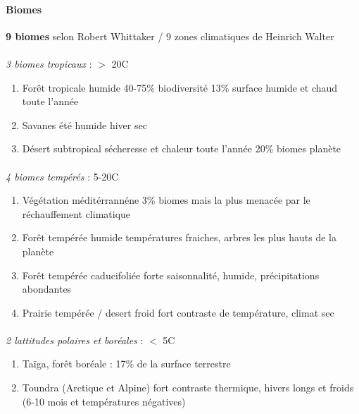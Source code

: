 \documentclass {article}
\begin{document}
\paragraph{Biomes}
\textbf{9 biomes} selon Robert Whittaker / 9 zones climatiques de Heinrich Walter

\paragraph{}
\emph{3 biomes tropicaux} : $>$ 20\textdegree C\\
\begin{enumerate}
\item Forêt tropicale humide 40-75\% biodiversité 13\% surface humide et chaud toute l'année
\item Savanes été humide hiver sec
\item Désert subtropical sécheresse et chaleur toute l'année 20\% biomes planète
\end{enumerate}

\paragraph{}
\emph{4 biomes tempérés} : 5-20\textdegree C\\
\begin{enumerate}
\item Végétation méditérrannéne 3\% biomes mais la plus menacée par le réchauffement climatique
\item Forêt tempérée humide températures fraiches, arbres les plus hauts de la planète
\item Forêt tempérée caducifoliée forte saisonnalité, humide, précipitations abondantes
\item Prairie tempérée / desert froid fort contraste de température, climat sec
\end{enumerate}

\paragraph{}
\emph{2 lattitudes polaires et boréales} : $<$ 5\textdegree C\\
\begin{enumerate}
\item Taïga, forêt boréale : 17\% de la surface terrestre
\item Toundra (Arctique et Alpine) fort contraste thermique, hivers longs et froids (6-10 mois et températures négatives)
\end{enumerate}
\bigskip
\end{document}
